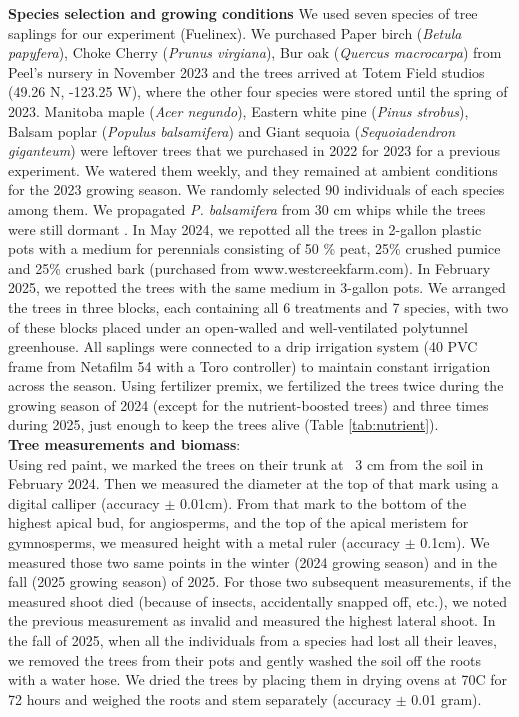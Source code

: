 \documentclass{article}
\begin{document}
\textbf{Species selection and growing conditions}
We used seven species of tree saplings for our experiment (Fuelinex). We purchased Paper birch (\textit{Betula papyfera}), Choke Cherry (\textit{Prunus virgiana}), Bur oak (\textit{Quercus macrocarpa}) from Peel's nursery in November 2023 and the trees arrived at Totem Field studios (49.26 \degree N, -123.25 \degree W), where the other four species were stored until the spring of 2023. Manitoba maple (\textit{Acer negundo}), Eastern white pine (\textit{Pinus strobus}), Balsam poplar (\textit{Populus balsamifera}) and Giant sequoia (\textit{Sequoiadendron giganteum}) were leftover trees that we purchased in 2022 for 2023 for a previous experiment. We watered them weekly, and they remained at ambient conditions for the 2023 growing season. We randomly selected 90 individuals of each species among them. We propagated \textit{P. balsamifera} from 30 cm whips while the trees were still dormant \citep{mc_carthy_early_2018}. In May 2024, we repotted all the trees in 2-gallon plastic pots with a medium for perennials consisting of 50 \% peat, 25\% crushed pumice and 25\% crushed bark (purchased from www.westcreekfarm.com). In February 2025, we repotted the trees with the same medium in 3-gallon pots. We arranged the trees in three blocks, each containing all 6 treatments and 7 species, with two of these blocks placed under an open-walled and well-ventilated polytunnel greenhouse. All saplings were connected to a drip irrigation system (40 PVC frame from Netafilm 54 with a Toro controller) to maintain constant irrigation across the season. Using fertilizer premix, we fertilized the trees twice during the growing season of 2024 (except for the nutrient-boosted trees) and three times during 2025, just enough to keep the trees alive (Table \ref{tab:nutrient}). \\

\textbf{Tree measurements and biomass}: \\
Using red paint, we marked the trees on their trunk at ~3 cm from the soil in February 2024. Then we measured the diameter at the top of that mark using a digital calliper (accuracy $\pm$ 0.01cm). From that mark to the bottom of the highest apical bud, for angiosperms, and the top of the apical meristem for gymnosperms, we measured height with a metal ruler (accuracy $\pm$ 0.1cm). We measured those two same points in the winter (2024 growing season) and in the fall (2025 growing season) of 2025. For those two subsequent measurements, if the measured shoot died (because of insects, accidentally snapped off, etc.), we noted the previous measurement as invalid and measured the highest lateral shoot. In the fall of 2025, when all the individuals from a species had lost all their leaves, we removed the trees from their pots and gently washed the soil off the roots with a water hose. We dried the trees by placing them in drying ovens at 70\degree C for 72 hours and weighed the roots and stem separately (accuracy $\pm$ 0.01 gram). \\
\end{document}
